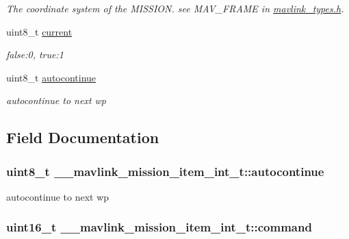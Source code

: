 \begin{DoxyCompactItemize}
\begin{DoxyCompactList}\small\item\em The coordinate system of the M\+I\+S\+S\+I\+O\+N. see M\+A\+V\+\_\+\+F\+R\+A\+M\+E in \hyperlink{mavlink__types_8h}{mavlink\+\_\+types.\+h}. \end{DoxyCompactList}\item 
uint8\+\_\+t \hyperlink{struct____mavlink__mission__item__int__t_a544991858ce442d37e3a911a36803924}{current}
\begin{DoxyCompactList}\small\item\em false\+:0, true\+:1 \end{DoxyCompactList}\item 
uint8\+\_\+t \hyperlink{struct____mavlink__mission__item__int__t_a870661783722b1aee5d91ac8b52394f4}{autocontinue}
\begin{DoxyCompactList}\small\item\em autocontinue to next wp \end{DoxyCompactList}\end{DoxyCompactItemize}


\subsection{Field Documentation}
\hypertarget{struct____mavlink__mission__item__int__t_a870661783722b1aee5d91ac8b52394f4}{
\subsubsection[{autocontinue}]{\setlength{\rightskip}{0pt plus 5cm}uint8\+\_\+t \+\_\+\+\_\+mavlink\+\_\+mission\+\_\+item\+\_\+int\+\_\+t\+::autocontinue}}\label{struct____mavlink__mission__item__int__t_a870661783722b1aee5d91ac8b52394f4}


autocontinue to next wp 

\hypertarget{struct____mavlink__mission__item__int__t_a9a64fb49961faafbb59ebee26ab2d095}{
\subsubsection[{command}]{\setlength{\rightskip}{0pt plus 5cm}uint16\+\_\+t \+\_\+\+\_\+mavlink\+\_\+mission\+\_\+item\+\_\+int\+\_\+t\+::command}}\label{struct____mavlink__mission__item__int__t_a9a64fb49961faafbb59ebee26ab2d095}


